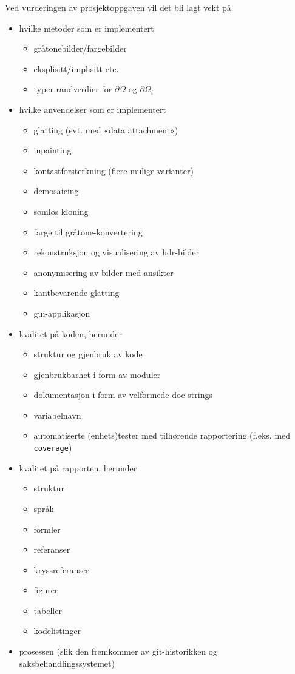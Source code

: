 \documentclass[11pt,a4paper]{article}
\begin{document}
Ved vurderingen av prosjektoppgaven vil det bli lagt vekt på
\begin{itemize}[noitemsep]
\item hvilke metoder som er implementert
  \begin{itemize}[noitemsep]
  \item gråtonebilder/fargebilder
  \item eksplisitt/implisitt etc.
  \item typer randverdier for $\partial\Omega$ og $\partial\Omega_i$
  \end{itemize}
\item hvilke anvendelser som er implementert
  \begin{itemize}[noitemsep]
  \item glatting (evt. med «data attachment»)
  \item inpainting
  \item kontastforsterkning (flere mulige varianter)
  \item demosaicing
  \item sømløs kloning
  \item farge til gråtone-konvertering
  \item rekonstruksjon og visualisering av hdr-bilder 
  \item anonymisering av bilder med ansikter
  \item kantbevarende glatting
  \item gui-applikasjon
  \end{itemize}
\item kvalitet på koden, herunder
  \begin{itemize}[noitemsep]
  \item struktur og gjenbruk av kode
  \item gjenbrukbarhet i form av moduler
  \item dokumentasjon i form av velformede doc-strings
  \item variabelnavn
  \item automatiserte (enhets)tester med tilhørende rapportering (f.eks. med \texttt{coverage})
  \end{itemize}
\item kvalitet på rapporten, herunder
  \begin{itemize}[noitemsep]
  \item struktur
  \item språk
  \item formler
  \item referanser
  \item kryssreferanser
  \item figurer
  \item tabeller
  \item kodelistinger
  \end{itemize}
\item prosessen (slik den fremkommer av git-historikken og saksbehandlingssystemet)
\end{itemize}
\end{document}
